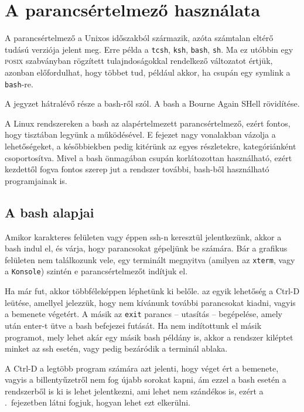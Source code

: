 \chapter{A parancsértelmező használata}%
\label{cha:shell}


A parancsértelmező a Unixos időszakból származik, azóta számtalan eltérő tudású
verziója jelent meg. Erre példa a \texttt{tcsh}, \texttt{ksh}, \texttt{bash},
\texttt{sh}. Ma ez utóbbin egy \textsc{posix} szabványban \cite{posix:shell}
rögzített tulajndoságokkal rendelkező változatot értjük, azonban előfordulhat,
hogy többet tud, például akkor, ha csupán egy symlink a \texttt{bash}-re.

A jegyzet hátralévő része a bash-ről szól. A bash a Bourne Again SHell
rövidítése.

A Linux rendszereken a bash az alapértelmezett parancsértelmező, ezért fontos,
hogy tisztában legyünk a működésével. E fejezet nagy vonalakban vázolja a
lehetőségeket, a későbbiekben pedig kitérünk az egyes részletekre,
kategóriánként csoportosítva. Mivel a bash önmagában csupán korlátozottan
használható, ezért kezdettől fogva fontos szerep jut a rendszer további,
bash-ből használható programjainak is.

\section{A bash alapjai}

Amikor karakteres felületen vagy éppen ssh-n keresztül jelentkezünk, akkor a
bash indul el, és várja, hogy parancsokat gépeljünk be számára. Bár a grafikus
felületen nem találkozunk vele, egy terminált megnyitva (amilyen az
\texttt{xterm}, vagy a \texttt{Konsole}) szintén e parancsértelmezőt indítjuk
el.

Ha már fut, akkor többféleképpen léphetünk ki belőle. az egyik lehetőség a
Ctrl-D leütése, amellyel jelezzük, hogy nem kívánunk további parancsokat kiadni,
vagyis a bemenete végetért. A másik az \texttt{exit} parancs -- utasítás --
begépelése, amely után enter-t ütve a bash befejezei futását. Ha nem indítottunk
el másik programot, mely lehet akár egy másik bash példány is, akkor a rendszer
kiléptet minket az ssh esetén, vagy pedig bezáródik a terminál ablaka.

A Ctrl-D a legtöbb program számára azt jelenti, hogy véget ért a bemenete,
vagyis a billentyűzetről nem fog újabb sorokat kapni, ám ezzel a bash esetén a
rendszerből is ki is lehet jelentkezni, ami lehet nem szándékos is, ezért a
.\ fejezetben látni fogjuk, hogyan lehet ezt elkerülni.


